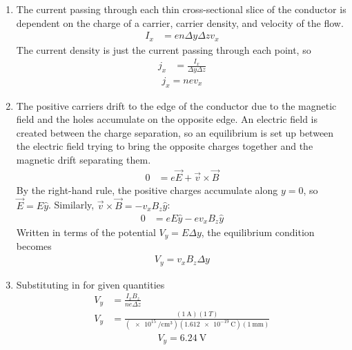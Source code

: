 \begin{enumerate}
	\item
		The current passing through each thin cross-sectional slice of the
		conductor is dependent on the charge of a carrier, carrier density,
		and velocity of the flow.
		\begin{align*}
			I_x &= enΔyΔzv_x
		\end{align*}
		The current density is just the current passing through each point, so
		\begin{align*}
			j_x &= \frac{I_x}{ΔyΔz}
		\end{align*}
		\begin{align}
			\boxed{
			j_x = nev_x
			}
		\end{align}
	\item
		The positive carriers drift to the edge of the conductor due to the
		magnetic field and the holes accumulate on the opposite edge. An
		electric field is created between the charge separation, so an
		equilibrium is set up between the electric field trying to bring the
		opposite charges together and the magnetic drift separating them.
		\begin{align*}
			0 &= e\vec E + \vec v × \vec B
		\end{align*}
		By the right-hand rule, the positive charges accumulate along $y=0$, so
		$\vec E = E \hat y$. Similarly, $\vec v × \vec B = -v_xB_z\hat y$:
		\begin{align*}
			0 &= eE\hat y - ev_xB_z\hat y
		\end{align*}
		Written in terms of the potential $V_y = EΔy$, the equilibrium
		condition becomes
		\begin{align}
			\boxed{
			V_y = v_xB_zΔy
			}
		\end{align}
	\item
		Substituting in for given quantities
		\begin{align*}
			V_y &= \frac{I_x B_z}{neΔz} \\
			V_y &= \frac{(\SI{1}{\A})(\SI{1}{T})}
				{(\SI[per-mode=reciprocal]{e15}{\per\cm\cubed})
				 (\SI{1.612e-19}{\coulomb})(\SI{1}{\mm})}
		\end{align*}
		\begin{align}
			\boxed{
			V_y = \SI{6.24}{\V}
			}
		\end{align}
\end{enumerate}
